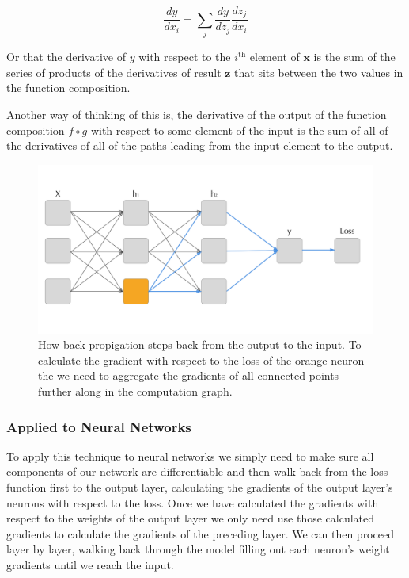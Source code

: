 \documentclass[]{book}
\theoremstyle{definition}
\theoremstyle{definition}
\theoremstyle{definition}
\theoremstyle{remark}
\begin{document}
\begin{equation} 
  \frac{dy}{dx_i} = \sum_{j}\frac{dy}{dz_j}\frac{dz_j}{dx_i}
  \label{eq:chainrulemv}
\end{equation}

Or that the derivative of \(y\) with respect to the \(i^{\text{th}}\)
element of \(\textbf{x}\) is the sum of the series of products of the
derivatives of result \(\textbf{z}\) that sits between the two values in
the function composition.

Another way of thinking of this is, the derivative of the output of the
function composition \(f \circ g\) with respect to some element of the
input is the sum of all of the derivatives of all of the paths leading
from the input element to the output.

\begin{figure}
\centering
\includegraphics{figures/backprop.png}
\caption{\label{fig:unnamed-chunk-2}How back propigation steps back from the
output to the input. To calculate the gradient with respect to the loss
of the orange neuron the we need to aggregate the gradients of all
connected points further along in the computation graph.}
\end{figure}

\subsubsection{Applied to Neural
Networks}\label{applied-to-neural-networks}

To apply this technique to neural networks we simply need to make sure
all components of our network are differentiable and then walk back from
the loss function first to the output layer, calculating the gradients
of the output layer's neurons with respect to the loss. Once we have
calculated the gradients with respect to the weights of the output layer
we only need use those calculated gradients to calculate the gradients
of the preceding layer. We can then proceed layer by layer, walking back
through the model filling out each neuron's weight gradients until we
reach the input.
\end{document}
